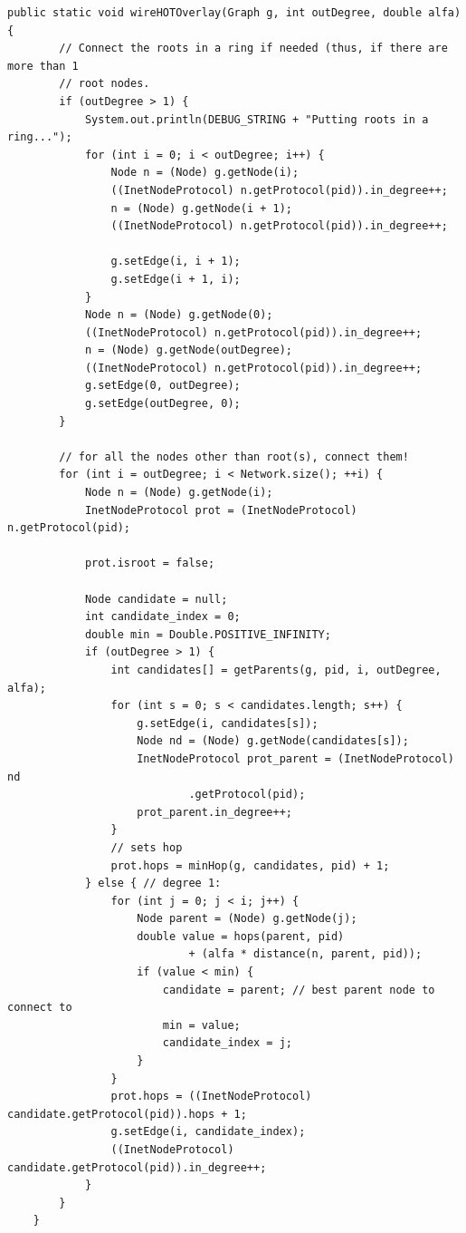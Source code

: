 \documentclass[a4paper,12pt]{article}
\begin{document}
\footnotesize
\begin{verbatim}
public static void wireHOTOverlay(Graph g, int outDegree, double alfa) {
        // Connect the roots in a ring if needed (thus, if there are more than 1
        // root nodes.
        if (outDegree > 1) {
            System.out.println(DEBUG_STRING + "Putting roots in a ring...");
            for (int i = 0; i < outDegree; i++) {
                Node n = (Node) g.getNode(i);
                ((InetNodeProtocol) n.getProtocol(pid)).in_degree++;
                n = (Node) g.getNode(i + 1);
                ((InetNodeProtocol) n.getProtocol(pid)).in_degree++;

                g.setEdge(i, i + 1);
                g.setEdge(i + 1, i);
            }
            Node n = (Node) g.getNode(0);
            ((InetNodeProtocol) n.getProtocol(pid)).in_degree++;
            n = (Node) g.getNode(outDegree);
            ((InetNodeProtocol) n.getProtocol(pid)).in_degree++;
            g.setEdge(0, outDegree);
            g.setEdge(outDegree, 0);
        }

        // for all the nodes other than root(s), connect them!
        for (int i = outDegree; i < Network.size(); ++i) {
            Node n = (Node) g.getNode(i);
            InetNodeProtocol prot = (InetNodeProtocol) n.getProtocol(pid);

            prot.isroot = false;

            Node candidate = null;
            int candidate_index = 0;
            double min = Double.POSITIVE_INFINITY;
            if (outDegree > 1) {
                int candidates[] = getParents(g, pid, i, outDegree, alfa);
                for (int s = 0; s < candidates.length; s++) {
                    g.setEdge(i, candidates[s]);
                    Node nd = (Node) g.getNode(candidates[s]);
                    InetNodeProtocol prot_parent = (InetNodeProtocol) nd
                            .getProtocol(pid);
                    prot_parent.in_degree++;
                }
                // sets hop
                prot.hops = minHop(g, candidates, pid) + 1;
            } else { // degree 1:
                for (int j = 0; j < i; j++) {
                    Node parent = (Node) g.getNode(j);
                    double value = hops(parent, pid)
                            + (alfa * distance(n, parent, pid));
                    if (value < min) {
                        candidate = parent; // best parent node to connect to
                        min = value;
                        candidate_index = j;
                    }
                }
                prot.hops = ((InetNodeProtocol) candidate.getProtocol(pid)).hops + 1;
                g.setEdge(i, candidate_index);
                ((InetNodeProtocol) candidate.getProtocol(pid)).in_degree++;
            }
        }
    }
\end{verbatim}
\normalsize
\end{document}
